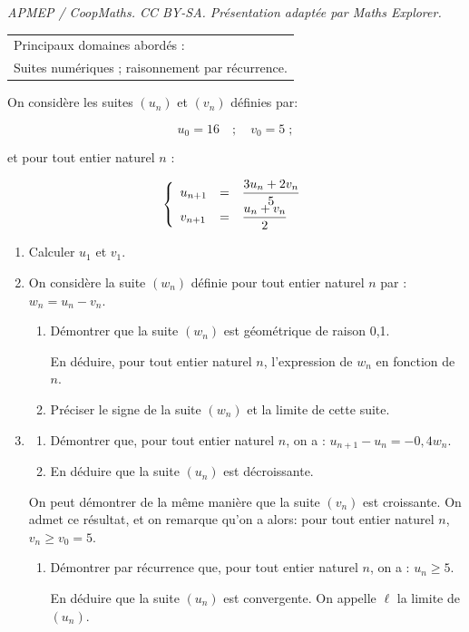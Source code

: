 \documentclass[10pt]{article}
\begin{document}
\noindent\textit{APMEP / CoopMaths. CC BY-SA. Présentation adaptée par Maths Explorer.}\par\medskip
\medskip

\begin{tabular}{|l|}\hline
Principaux domaines abordés :\\
Suites numériques ; raisonnement par récurrence.\\ \hline
\end{tabular}

\medskip

On considère les suites $\left(u_n\right)$ et $\left(v_n\right)$ définies par:

\[u_0 = 16 \quad ;\quad  v_0 = 5 \;;\]

et pour tout entier naturel $n$ :

\renewcommand\arraystretch{2}
\[\left\{\begin{array}{l c l}
u_{n+1}&=&\dfrac{3u_n + 2v_n}{5}\\
v_{n+1}&=& \dfrac{u_n + v_n}{2}
\end{array}\right.\]
\renewcommand\arraystretch{1}

\smallskip

\begin{enumerate}
\item Calculer $u_1$ et $v_1$.
\item On considère la suite $\left(w_n\right)$ définie pour tout entier naturel $n$ par : $w_n = u_n - v_n$.
	\begin{enumerate}
		\item Démontrer que la suite $\left(w_n\right)$ est géométrique de raison 0,1.
		
En déduire, pour tout entier naturel $n$, l'expression de $w_n$ en fonction de $n$.
		\item Préciser le signe de la suite $\left(w_n\right)$  et la limite de cette suite.
	\end{enumerate}
\item 
	\begin{enumerate}
		\item Démontrer que, pour tout entier naturel $n$, on a : $u_{n+1} - u_n = - 0,4 w_n$.
		\item En déduire que la suite $\left(u_n\right)$ est décroissante.

\end{enumerate}
		
On peut démontrer de la même manière que la suite $\left(v_n\right)$ est croissante. On admet ce résultat, et on remarque qu'on a alors: pour tout entier naturel $n$,\, $v_n \geqslant v_0 = 5$.
\begin{enumerate}[resume]
		\item Démontrer par récurrence que, pour tout entier naturel $n$, on a : $u_n \geqslant 5$. 
		
En déduire que la suite $\left(u_n\right)$ est convergente. On appelle $\ell$ la limite de $\left(u_n\right)$.
	\end{enumerate}
\end{enumerate}
	
\end{document}
